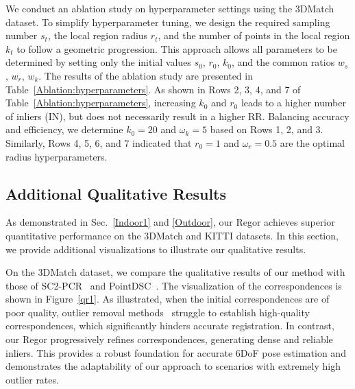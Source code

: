We conduct an ablation study on hyperparameter settings using the 3DMatch dataset. To simplify hyperparameter tuning, we design the required sampling number $s_t$, the local region radius $r_t$, and the number of points in the local region $k_t$ to follow a geometric progression. This approach allows all parameters to be determined by setting only the initial values $s_0$, $r_0$, $k_0$, and the common ratios $w_s$, $w_r$, $w_k$. The results of the ablation study are presented in Table~\ref{Ablation:hyperparameters}. As shown in Rows 2, 3, 4, and 7 of Table~\ref{Ablation:hyperparameters}, increasing $k_0$ and $r_0$ leads to a higher number of inliers (IN), but does not necessarily result in a higher RR. Balancing accuracy and efficiency, we determine $k_0=20$ and $\omega_k=5$ based on Rows 1, 2, and 3. Similarly, Rows 4, 5, 6, and 7 indicated that $r_0=1$ and $\omega_r=0.5$ are the optimal radius hyperparameters.


\subsection{Additional Qualitative Results}
As demonstrated in Sec.~\ref{Indoor1} and \ref{Outdoor}, our Regor achieves superior quantitative performance on the 3DMatch and KITTI datasets. In this section, we provide additional visualizations to illustrate our qualitative results.

\begin{figure*}[ht]
    \caption{
        Correspondence results on 3DMatch.
       }
    \label{qr1}
\end{figure*}

\begin{figure*}[ht]
    \caption{
        Registration results on 3DMatch.
       }
    \label{qr2}
\end{figure*}

On the 3DMatch dataset, we compare the qualitative results of our method with those of SC2-PCR~\cite{chen2022sc2} and PointDSC~\cite{PointDSC}. The visualization of the correspondences is shown in Figure~\ref{qr1}. As illustrated, when the initial correspondences are of poor quality, outlier removal methods~\cite{fischler1981random,chen2022sc2,PointDSC} struggle to establish high-quality correspondences, which significantly hinders accurate registration. In contrast, our Regor progressively refines correspondences, generating dense and reliable inliers. This provides a robust foundation for accurate 6DoF pose estimation and demonstrates the adaptability of our approach to scenarios with extremely high outlier rates.

